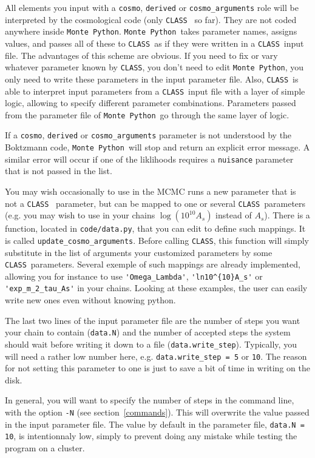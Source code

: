 \documentclass[10pt]{article}
\newcommand{\CLASS}{\texttt{CLASS}}
\newcommand{\MP}{\texttt{Monte Python}}
\begin{document}
  All elements you input with a \verb?cosmo?, \verb?derived? or \verb?cosmo_arguments? role will
  be interpreted by the cosmological code (only \CLASS~ so far). They are not coded anywhere inside \MP. \MP~takes parameter names, assigns values, and passes all of these to \CLASS~as if they were written in a \CLASS~input file. The advantages of this scheme are obvious. If you need to fix or vary whatever parameter known by \CLASS, you don't need to edit \MP, you only need to write these parameters in the input parameter file. Also, \CLASS~is able to interpret input parameters from a \CLASS~input file with a layer of simple logic, allowing to specify different parameter combinations. Parameters passed from the parameter file of \MP~go through the same layer of logic. 
  
  If a \verb?cosmo?, \verb?derived? or \verb?cosmo_arguments? parameter is not understood by the Boktzmann code, \MP~will stop and return an explicit error message. A similar error will occur if one of the liklihoods requires a \verb?nuisance? parameter that is not passed in the list.

  You may wish occasionally to use in the MCMC runs a new parameter that is not a \CLASS~ parameter, but can be mapped to one or several \CLASS~parameters (e.g. you may wish to use in your chains $\log(10^{10}A_s)$ instead of $A_s$). There is a function, located in \verb?code/data.py?, that you can edit to define such mappings. It is called  \verb?update_cosmo_arguments?. Before calling \CLASS, this function will simply substitute in the list of arguments your customized parameters by some \CLASS~parameters. Several exemple of such mappings are already implemented, allowing you for instance to use 
\verb?'Omega_Lambda'?, \verb?'ln10^{10}A_s'? or \verb?'exp_m_2_tau_As'? in your chains. Looking at these examples, the user can easily write new ones even without knowing python.
  
  The last two lines of the input parameter file are the number of steps you want your chain to contain
  (\verb?data.N?) and the number of accepted steps the system should wait
  before writing it down to a file (\verb?data.write_step?). Typically, you
  will need a rather low number here, e.g. \verb?data.write_step = 5? or \verb?10?. The reason for not setting this parameter to one is just to save a bit of time in writing on the disk.
 
  In general, you will want to specify the number of steps in the command line,
  with the option \verb?-N? (see section~\ref{commands}). This will overwrite the value passed in the input parameter file. The value by default in the parameter file, \verb?data.N = 10?,
  is intentionnaly low, 
  simply to prevent doing any mistake while testing the program on a cluster.
\end{document}
